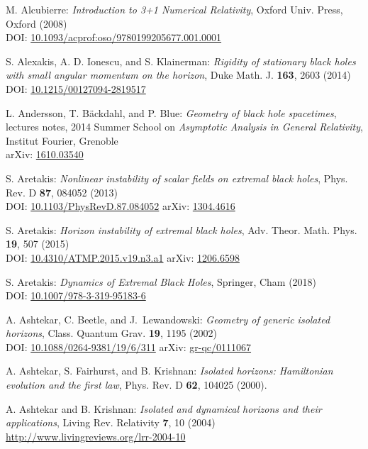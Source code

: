 \begin{thebibliography}{123}
M. Alcubierre:
{\em Introduction to 3+1 Numerical Relativity},
Oxford Univ. Press, Oxford (2008)\\
DOI: \href{https://doi.org/10.1093/acprof:oso/9780199205677.001.0001}{10.1093/acprof:oso/9780199205677.001.0001}

S. Alexakis, A. D. Ionescu, and S. Klainerman: {\em Rigidity of stationary black holes with small angular momentum on the horizon},
Duke Math. J. {\bf 163}, 2603 (2014)\\
DOI: \href{https://doi.org/10.1215/00127094-2819517}{10.1215/00127094-2819517}

L. Andersson, T. Bäckdahl, and P. Blue:
{\em Geometry of black hole spacetimes},
lectures notes,
2014 Summer School on {\em Asymptotic Analysis in General Relativity},
Institut Fourier, Grenoble\\
arXiv: \href{https://arxiv.org/abs/1610.03540}{1610.03540}

S. Aretakis:
{\em Nonlinear instability of scalar fields on extremal black holes},
Phys. Rev. D {\bf 87}, 084052 (2013)\\
DOI: \href{https://doi.org/10.1103/PhysRevD.87.084052}{10.1103/PhysRevD.87.084052}\hfill
arXiv: \href{https://arxiv.org/abs/1304.4616}{1304.4616}

S. Aretakis:
{\em Horizon instability of extremal black holes},
Adv. Theor. Math. Phys. {\bf 19}, 507 (2015)\\
DOI: \href{https://doi.org/10.4310/ATMP.2015.v19.n3.a1}{10.4310/ATMP.2015.v19.n3.a1}\hfill
arXiv: \href{https://arxiv.org/abs/1206.6598}{1206.6598}

S. Aretakis:
{\em Dynamics of Extremal Black Holes},
Springer, Cham (2018)\\
DOI: \href{https://doi.org/10.1007/978-3-319-95183-6}{10.1007/978-3-319-95183-6}

A. Ashtekar, C. Beetle, and J.~Lewandowski:
{\em Geometry of generic isolated horizons},
Class. Quantum Grav. {\bf 19}, 1195 (2002)\\
DOI: \href{https://doi.org/10.1088/0264-9381/19/6/311}{10.1088/0264-9381/19/6/311}\hfill
arXiv: \href{https://arxiv.org/abs/gr-qc/0111067}{gr-qc/0111067}

A. Ashtekar, S. Fairhurst, and B. Krishnan: {\em Isolated horizons:
Hamiltonian evolution and the first law},
Phys. Rev. D {\bf 62}, 104025 (2000).

A. Ashtekar and B. Krishnan: {\em Isolated and dynamical horizons
and their applications},
Living Rev. Relativity {\bf 7}, 10 (2004) \\
\url{http://www.livingreviews.org/lrr-2004-10}


\end{thebibliography}

